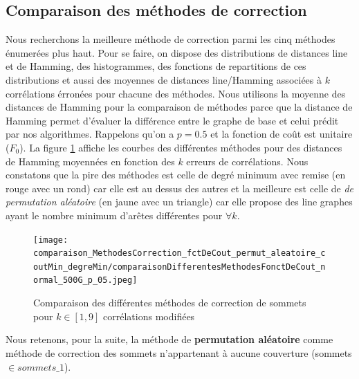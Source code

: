 \documentclass[onecolumn, 12pt]{book}
\begin{document}
\subsection{Comparaison des m\'ethodes de correction}
Nous recherchons la meilleure m\'ethode de correction parmi les cinq m\'ethodes \'enumer\'ees plus haut. 
Pour se faire, on dispose des distributions de distances line et de Hamming, des histogrammes, des fonctions de repartitions de ces distributions et aussi des moyennes de distances line/Hamming associ\'ees \`a $k$ corr\'elations \'erron\'ees pour chacune des m\'ethodes.  
Nous utilisons la moyenne des distances de Hamming pour la comparaison de m\'ethodes parce que la distance de Hamming permet d'\'evaluer la diff\'erence entre le graphe de base et celui pr\'edit par nos algorithmes.\newline
Rappelons qu'on a $p=0.5$ et la fonction de co\^ut est unitaire ($F_0$).
La figure \ref{compareDifferentesMethodesCorrectionSommets_fct_cout_unitaire_p05} affiche les courbes  des diff\'erentes m\'ethodes pour des distances de Hamming moyenn\'ees en fonction des $k$ erreurs de corr\'elations.
\newline
Nous constatons  que la pire des m\'ethodes est celle de degr\'e minimum avec remise (en rouge avec un rond) car elle est au dessus des autres et la meilleure est celle de {\em de permutation al\'eatoire} (en jaune avec un triangle) car elle propose des line graphes ayant  le nombre minimum d'ar\^etes diff\'erentes pour $ \forall k$.\newline
\begin{centering} 
\begin{figure}[htb!] 
\texttt{[image: comparaison\_MethodesCorrection\_fctDeCout\_permut\_aleatoire\_coutMin\_degreMin/comparaisonDifferentesMethodesFonctDeCout\_normal\_500G\_p\_05.jpeg]}
\caption{ Comparaison des diff\'erentes m\'ethodes de correction de sommets pour $k \in [1,9]$ corr\'elations modifi\'ees }
\label{compareDifferentesMethodesCorrectionSommets_fct_cout_unitaire_p05} 
\end{figure}
\end{centering} 
Nous retenons, pour la suite, la m\'ethode de {\bf permutation al\'eatoire} comme m\'ethode de correction des sommets n'appartenant \`a aucune couverture (sommets $\in sommets\_1$).
\newline
\end{document}
